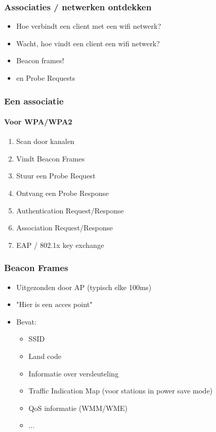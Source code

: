 \documentclass{beamer}
\begin{document}
  \begin{frame}

  \begin{frame}
    \frametitle{Associaties / netwerken ontdekken}

    \begin{itemize}
      \item Hoe verbindt een client met een wifi netwerk?
        \pause
      \item Wacht, hoe vindt een client een wifi netwerk?
        \pause
      \item Beacon frames!
        \pause
      \item en Probe Requests
    \end{itemize}
  \end{frame}

  \begin{frame}
    \frametitle{Een associatie}
    \framesubtitle{Voor WPA/WPA2}

    \begin{enumerate}
      \item Scan door kanalen
        \pause
      \item Vindt Beacon Frames
        \pause
      \item Stuur een Probe Request
        \pause
      \item Ontvang een Probe Response
        \pause
      \item Authentication Request/Response
      \item Association Request/Response
        \pause
      \item EAP / 802.1x key exchange
    \end{enumerate}
  \end{frame}

  \begin{frame}
    \frametitle{Beacon Frames}
    \begin{itemize}
      \item Uitgezonden door AP (typisch elke 100ms)
      \item "Hier is een acces point"
      \item Bevat:
        \begin{itemize}
          \item SSID
          \item Land code
          \item Informatie over versleuteling
          \item Traffic Indication Map (voor stations in power save mode)
          \item QoS informatie (WMM/WME)
          \item ...
        \end{itemize}
    \end{itemize}
  \end{frame}


\end{frame}
\end{document}
